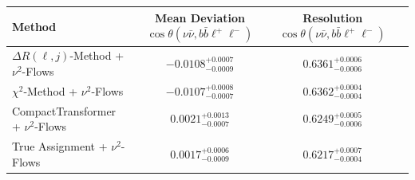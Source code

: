     \begin{tabular}{lccc}
        \toprule
        Method & Mean Deviation $\cos\theta(\nu\bar{\nu}, b\bar{b}\ell^+\ell^-)$ & Resolution $\cos\theta(\nu\bar{\nu}, b\bar{b}\ell^+\ell^-)$ \\
        \midrule
        $\Delta R(\ell,j)$-Method + $\nu^2$-Flows & $-0.0108^{+0.0007}_{-0.0009}$ & $0.6361^{+0.0006}_{-0.0006}$ \\
        $\chi^2$-Method + $\nu^2$-Flows & $-0.0107^{+0.0008}_{-0.0007}$ & $0.6362^{+0.0004}_{-0.0004}$ \\
        CompactTransformer + $\nu^2$-Flows & $0.0021^{+0.0013}_{-0.0007}$ & $0.6249^{+0.0005}_{-0.0006}$ \\
        True Assignment + $\nu^2$-Flows & $0.0017^{+0.0006}_{-0.0009}$ & $0.6217^{+0.0007}_{-0.0004}$ \\
        \bottomrule
    \end{tabular}